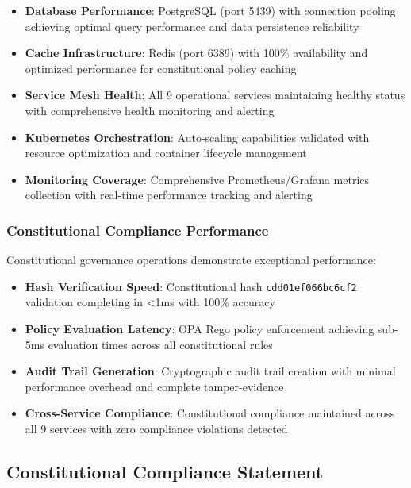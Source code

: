\begin{itemize}[leftmargin=*,itemsep=1pt,parsep=1pt]
    \item \textbf{Database Performance}: PostgreSQL (port 5439) with connection pooling achieving optimal query performance and data persistence reliability
    \item \textbf{Cache Infrastructure}: Redis (port 6389) with 100\% availability and optimized performance for constitutional policy caching
    \item \textbf{Service Mesh Health}: All 9 operational services maintaining healthy status with comprehensive health monitoring and alerting
    \item \textbf{Kubernetes Orchestration}: Auto-scaling capabilities validated with resource optimization and container lifecycle management
    \item \textbf{Monitoring Coverage}: Comprehensive Prometheus/Grafana metrics collection with real-time performance tracking and alerting
\end{itemize}

\subsubsection{Constitutional Compliance Performance}
Constitutional governance operations demonstrate exceptional performance:
\begin{itemize}[leftmargin=*,itemsep=1pt,parsep=1pt]
    \item \textbf{Hash Verification Speed}: Constitutional hash \texttt{cdd01ef066bc6cf2} validation completing in <1ms with 100\% accuracy
    \item \textbf{Policy Evaluation Latency}: OPA Rego policy enforcement achieving sub-5ms evaluation times across all constitutional rules
    \item \textbf{Audit Trail Generation}: Cryptographic audit trail creation with minimal performance overhead and complete tamper-evidence
    \item \textbf{Cross-Service Compliance}: Constitutional compliance maintained across all 9 services with zero compliance violations detected
\end{itemize}

\subsection{Constitutional Compliance Statement}
\label{subsec:constitutional_compliance}


